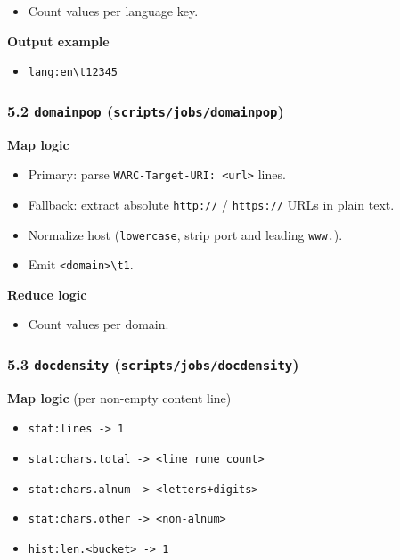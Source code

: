 \documentclass[
]{article}
\providecommand{\tightlist}{%
  \setlength{\itemsep}{0pt}\setlength{\parskip}{0pt}}
\begin{document}
\begin{itemize}
\tightlist
\item
  Count values per language key.
\end{itemize}

\textbf{Output example}

\begin{itemize}
\tightlist
\item
  \texttt{lang:en\textbackslash{}t12345}
\end{itemize}

\subsubsection{\texorpdfstring{5.2 \texttt{domainpop}
(\texttt{scripts/jobs/domainpop})}{5.2 domainpop (scripts/jobs/domainpop)}}\label{domainpop-scriptsjobsdomainpop}

\textbf{Map logic}

\begin{itemize}
\tightlist
\item
  Primary: parse \texttt{WARC-Target-URI:\ \textless{}url\textgreater{}}
  lines.
\item
  Fallback: extract absolute \texttt{http://} / \texttt{https://} URLs
  in plain text.
\item
  Normalize host (\texttt{lowercase}, strip port and leading
  \texttt{www.}).
\item
  Emit \texttt{\textless{}domain\textgreater{}\textbackslash{}t1}.
\end{itemize}

\textbf{Reduce logic}

\begin{itemize}
\tightlist
\item
  Count values per domain.
\end{itemize}

\subsubsection{\texorpdfstring{5.3 \texttt{docdensity}
(\texttt{scripts/jobs/docdensity})}{5.3 docdensity (scripts/jobs/docdensity)}}\label{docdensity-scriptsjobsdocdensity}

\textbf{Map logic} (per non-empty content line)

\begin{itemize}
\tightlist
\item
  \texttt{stat:lines\ -\textgreater{}\ 1}
\item
  \texttt{stat:chars.total\ -\textgreater{}\ \textless{}line\ rune\ count\textgreater{}}
\item
  \texttt{stat:chars.alnum\ -\textgreater{}\ \textless{}letters+digits\textgreater{}}
\item
  \texttt{stat:chars.other\ -\textgreater{}\ \textless{}non-alnum\textgreater{}}
\item
  \texttt{hist:len.\textless{}bucket\textgreater{}\ -\textgreater{}\ 1}
\end{itemize}
\end{document}
